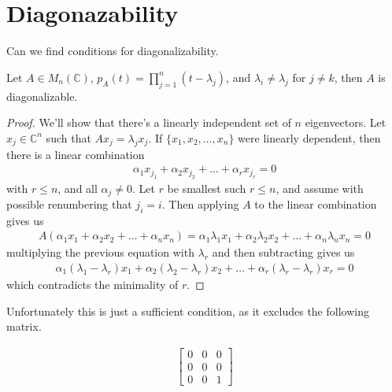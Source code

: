 

\section{Diagonazability}

Can we find conditions for diagonalizability.

\begin{theorem}
  Let $A \in M_n(\mathbb{C})$, $p_A(t) = \prod_{j = 1}^{n} (t -
  \lambda_j)$, and $\lambda_i \neq \lambda_j$ for $j \neq k$, then
  $A$ is diagonalizable.
\end{theorem}
\begin{proof}
  We'll show that there's a linearly independent set of $n$
  eigenvectors. Let $x_j \in \mathbb{C}^n$ such that $Ax_j =
  \lambda_j x_j$. If $\{x_1 , x_2 , \ldots , x_n  \}$ were linearly
  dependent, then there is a linear combination
  \begin{align*}
    \alpha_1x_{j_1} + \alpha_2x_{j_2} + \ldots + \alpha_rx_{j_r} = 0
  \end{align*}
  with $ r \le n$, and all $\alpha_j \neq 0$. Let $r$ be smallest
  such $r \le n$, and assume with possible renumbering that $j_i =
  i$. Then applying $ A$ to the linear combination gives us
  \begin{align*}
    A( \alpha_1x_{1} + \alpha_2x_{2} + \ldots + \alpha_nx_{n})
    =\alpha_1 \lambda_1 x_{1} + \alpha_2 \lambda_2 x_{2} + \ldots +
    \alpha_n \lambda_n x_{n}  = 0
  \end{align*}
  multiplying the previous equation with $\lambda_r$ and then
  subtracting gives us
  \begin{align*}
    \alpha_1 (\lambda_1 - \lambda_r) x_{1} + \alpha_2 (\lambda_2 -
    \lambda_r) x_{2} + \ldots + \alpha_r (\lambda_r - \lambda_r) x_{r}  = 0
  \end{align*}
  which contradicts the minimality of $r$.
\end{proof}

Unfortunately this is just a sufficient condition, as it excludes the
following matrix.

\begin{align*}
  \begin{bmatrix}%
    0 & 0 & 0\\
    0 & 0 & 0\\
    0 & 0 & 1
  \end{bmatrix}
\end{align*}

